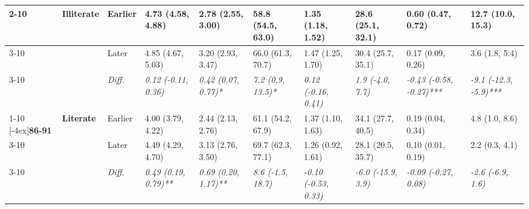 \documentclass[12pt, a4paper]{article}
\begin{document}
\begin{appendices}
\begin{table}[!p]
{\begin{tabular}[t]{>{}l>{}lllllllll}
        \cmidrule{2-10}
                                              & \multirow{3}{*}{\textbf{Illiterate}} & Earlier                       & 4.73 (4.58, 4.88)                           & 2.78 (2.55, 3.00)                           & 58.8 (54.5, 63.0)                           & 1.35 (1.18, 1.52)                             & 28.6 (25.1, 32.1)                           & 0.60 (0.47, 0.72)                               & 12.7 (10.0, 15.3)                             \\
        \cmidrule{3-10}
                                              &                                      & Later                         & 4.85 (4.67, 5.03)                           & 3.20 (2.93, 3.47)                           & 66.0 (61.3, 70.7)                           & 1.47 (1.25, 1.70)                             & 30.4 (25.7, 35.1)                           & 0.17 (0.09, 0.26)                               & 3.6 (1.8, 5.4)                                \\
        \cmidrule{3-10}
                                              &                                      & \cellcolor{gray!10}\em{Diff.} & \cellcolor{gray!10}\em{0.12 (-0.11, 0.36)}  & \cellcolor{gray!10}\em{0.42 (0.07, 0.77)*}  & \cellcolor{gray!10}\em{7.2 (0.9, 13.5)*}    & \cellcolor{gray!10}\em{0.12 (-0.16, 0.41)}    & \cellcolor{gray!10}\em{1.9 (-4.0, 7.7)}     & \cellcolor{gray!10}\em{-0.43 (-0.58, -0.27)***} & \cellcolor{gray!10}\em{-9.1 (-12.3, -5.9)***} \\
        \cmidrule{1-10}
        \multirow{9}{*}[-4ex]{\textbf{86-91}} & \multirow{3}{*}{\textbf{Literate}}   & Earlier                       & 4.00 (3.79, 4.22)                           & 2.44 (2.13, 2.76)                           & 61.1 (54.2, 67.9)                           & 1.37 (1.10, 1.63)                             & 34.1 (27.7, 40.5)                           & 0.19 (0.04, 0.34)                               & 4.8 (1.0, 8.6)                                \\
        \cmidrule{3-10}
                                              &                                      & Later                         & 4.49 (4.29, 4.70)                           & 3.13 (2.76, 3.50)                           & 69.7 (62.3, 77.1)                           & 1.26 (0.92, 1.61)                             & 28.1 (20.5, 35.7)                           & 0.10 (0.01, 0.19)                               & 2.2 (0.3, 4.1)                                \\
        \cmidrule{3-10}
                                              &                                      & \cellcolor{gray!10}\em{Diff.} & \cellcolor{gray!10}\em{0.49 (0.19, 0.79)**} & \cellcolor{gray!10}\em{0.69 (0.20, 1.17)**} & \cellcolor{gray!10}\em{8.6 (-1.5, 18.7)}    & \cellcolor{gray!10}\em{-0.10 (-0.53, 0.33)}   & \cellcolor{gray!10}\em{-6.0 (-15.9, 3.9)}   & \cellcolor{gray!10}\em{-0.09 (-0.27, 0.08)}     & \cellcolor{gray!10}\em{-2.6 (-6.9, 1.6)}      \\

\end{tabular}}
\end{table}
\end{appendices}
\end{document}
